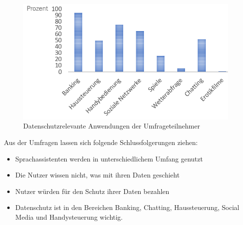 \begin{figure}[h]
	\centering
	\includegraphics[width=0.9\linewidth]{Picture/umfrage_anwendung}
	\caption[Datenschutzrelevante Anwendungen der Umfrageteilnehmers]{Datenschutzrelevante Anwendungen der Umfrageteilnehmer}
	\label{fig:umfrage_anwendung}
\end{figure}

Aus der Umfragen lassen sich folgende Schlussfolgerungen ziehen:
\begin{itemize}	
	\item Sprachassistenten werden in unterschiedlichem Umfang genutzt
	\item Die Nutzer wissen nicht, was mit ihren Daten geschieht
	\item Nutzer würden für den Schutz ihrer Daten bezahlen
	\item Datenschutz ist in den Bereichen Banking, Chatting, Haussteuerung, Social Media und Handysteuerung wichtig.
\end{itemize}
